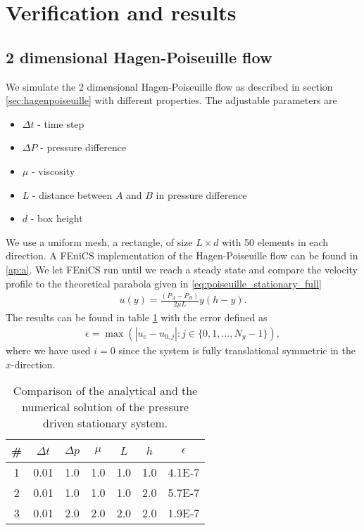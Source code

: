 \documentclass[a4paper,10pt]{article}
\renewcommand{\(}{\left(}
\renewcommand{\)}{\right)}
\begin{document}
\section{Verification and results}
\subsection{2 dimensional Hagen-Poiseuille flow}
We simulate the 2 dimensional Hagen-Poiseuille flow as described in section \ref{sec:hagenpoiseuille} with different properties. The adjustable parameters are
\begin{itemize}
\item $\Delta t$ - time step
\item $\Delta P$ - pressure difference
\item $\mu$ - viscosity
\item $L$ - distance between $A$ and $B$ in pressure difference
\item $d$ - box height
\end{itemize}
We use a uniform mesh, a rectangle, of size $L\times d$ with 50 elements in each direction. A FEniCS implementation of the Hagen-Poiseuille flow can be found in \ref{ap:a}. We let FEniCS run until we reach a steady state and compare the velocity profile to the theoretical parabola given in \eqref{eq:poiseuille_stationary_full}
\begin{align*}
  u(y) = \frac{(P_A-P_B)}{2\mu L}y(h-y).
\end{align*}
The results can be found in table \ref{tab:res_hagen_poiseuille} with the error defined as
\begin{align*}
  \epsilon = \max(|u_e - u_{0,j}| : j \in \{0,1,...,N_y - 1\}),
\end{align*}
where we have used $i=0$ since the system is fully translational symmetric in the $x$-direction.
\begin{table}[h!]
  \begin{center}
    \begin{tabular}[width=4in]{|c|c|c|c|c|c|c|}
      \hline
      \# & $\Delta t$ & $\Delta p$ & $\mu$ & $L$ & $h$ & $\epsilon$\\ \hline
      1 & 0.01 & 1.0 & 1.0 & 1.0 & 1.0 & 4.1E-7\\
      2 & 0.01 & 1.0 & 1.0 & 1.0 & 2.0 & 5.7E-7\\
      3 & 0.01 & 2.0 & 2.0 & 2.0 & 2.0 & 1.9E-7\\
      \hline
    \end{tabular}
  \caption{Comparison of the analytical and the numerical solution of the pressure driven stationary system.}
  \label{tab:res_hagen_poiseuille}
  \end{center}
\end{table}
\end{document}
